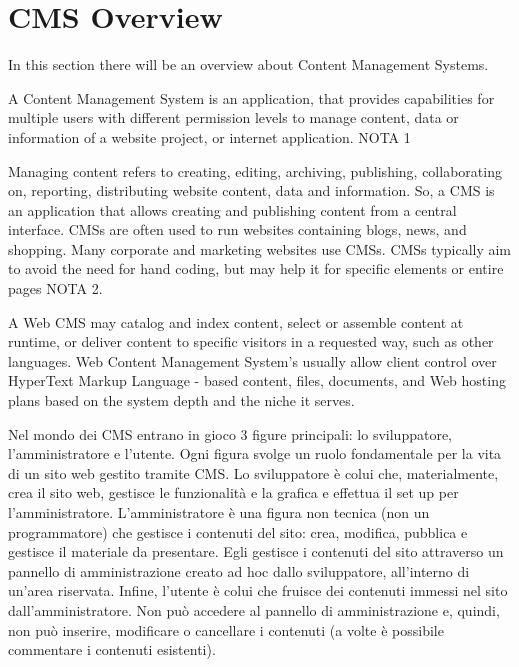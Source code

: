 \section{CMS Overview}
\label{sec:CMS_overview}

In this section there will be an overview about Content Management Systems.

A Content Management System is an application, that provides capabilities for multiple users with different permission levels to manage content, data or information of a website project, or internet application. NOTA 1

Managing content refers to creating, editing, archiving, publishing, collaborating on, reporting, distributing website content, data and information.
So, a CMS is an application that allows creating and publishing content from a central interface. CMSs are often used to run websites containing blogs, news, and shopping. Many corporate and marketing websites use CMSs. CMSs typically aim to avoid the need for hand coding, but may help it for specific elements or entire pages NOTA 2. 

A Web CMS may catalog and index content, select or assemble content at runtime, or deliver content to specific visitors in a requested way, such as other languages. Web Content Management System's usually allow client control over HyperText Markup Language - based content, files, documents, and Web hosting plans based on the system depth and the niche it serves.

Nel mondo dei CMS entrano in gioco 3 figure principali: lo sviluppatore, l’amministratore e l’utente. Ogni figura svolge un ruolo fondamentale per la vita di un sito web gestito tramite CMS.
Lo sviluppatore è colui che, materialmente, crea il sito web, gestisce le funzionalità e la grafica e effettua il set up per l’amministratore.
L’amministratore è una figura non tecnica (non un programmatore) che gestisce i contenuti del sito: crea, modifica, pubblica e gestisce il materiale da presentare. Egli gestisce i contenuti del sito attraverso un pannello di amministrazione creato ad hoc dallo sviluppatore, all’interno di un’area riservata.
Infine, l’utente è colui che fruisce dei contenuti immessi nel sito dall’amministratore. Non può accedere al pannello di amministrazione e, quindi, non può inserire, modificare o cancellare i contenuti (a volte è possibile commentare i contenuti esistenti).


